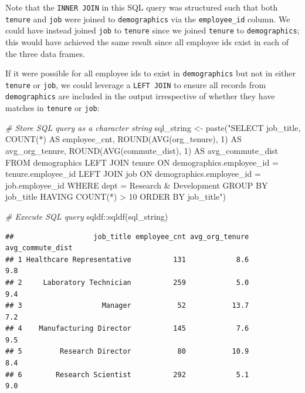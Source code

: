 \documentclass[
]{book}
\newenvironment{Shaded}{\begin{snugshade}}{\end{snugshade}}
\newcommand{\CommentTok}[1]{\textcolor[rgb]{0.56,0.35,0.01}{\textit{#1}}}
\newcommand{\FunctionTok}[1]{\textcolor[rgb]{0.00,0.00,0.00}{#1}}
\newcommand{\NormalTok}[1]{#1}
\newcommand{\OtherTok}[1]{\textcolor[rgb]{0.56,0.35,0.01}{#1}}
\newcommand{\SpecialCharTok}[1]{\textcolor[rgb]{0.00,0.00,0.00}{#1}}
\newcommand{\StringTok}[1]{\textcolor[rgb]{0.31,0.60,0.02}{#1}}
\begin{document}
Note that the \texttt{INNER\ JOIN} in this SQL query was structured such that both \texttt{tenure} and \texttt{job} were joined to \texttt{demographics} via the \texttt{employee\_id} column. We could have instead joined \texttt{job} to \texttt{tenure} since we joined \texttt{tenure} to \texttt{demographics}; this would have achieved the same result since all employee ids exist in each of the three data frames.

If it were possible for all employee ids to exist in \texttt{demographics} but not in either \texttt{tenure} or \texttt{job}, we could leverage a \texttt{LEFT\ JOIN} to ensure all records from \texttt{demographics} are included in the output irrespective of whether they have matches in \texttt{tenure} or \texttt{job}:

\begin{Shaded}
\begin{Highlighting}[]
\CommentTok{\# Store SQL query as a character string}
\NormalTok{sql\_string }\OtherTok{\textless{}{-}} \FunctionTok{paste}\NormalTok{(}\StringTok{"SELECT}
\StringTok{                      job\_title,}
\StringTok{                      COUNT(*) AS employee\_cnt,}
\StringTok{                      ROUND(AVG(org\_tenure), 1) AS avg\_org\_tenure,}
\StringTok{                      ROUND(AVG(commute\_dist), 1) AS avg\_commute\_dist}
\StringTok{                    FROM}
\StringTok{                        demographics}
\StringTok{                      LEFT JOIN}
\StringTok{                        tenure}
\StringTok{                      ON}
\StringTok{                        demographics.employee\_id = tenure.employee\_id}
\StringTok{                      LEFT JOIN}
\StringTok{                        job}
\StringTok{                      ON}
\StringTok{                        demographics.employee\_id = job.employee\_id}
\StringTok{                    WHERE}
\StringTok{                      dept = \textquotesingle{}Research \& Development\textquotesingle{}}
\StringTok{                    GROUP BY}
\StringTok{                      job\_title}
\StringTok{                    HAVING}
\StringTok{                      COUNT(*) \textgreater{} 10}
\StringTok{                    ORDER BY}
\StringTok{                      job\_title"}\NormalTok{)}

\CommentTok{\# Execute SQL query}
\NormalTok{sqldf}\SpecialCharTok{::}\FunctionTok{sqldf}\NormalTok{(sql\_string)}
\end{Highlighting}
\end{Shaded}

\begin{verbatim}
##                   job_title employee_cnt avg_org_tenure avg_commute_dist
## 1 Healthcare Representative          131            8.6              9.8
## 2     Laboratory Technician          259            5.0              9.4
## 3                   Manager           52           13.7              7.2
## 4    Manufacturing Director          145            7.6              9.5
## 5         Research Director           80           10.9              8.4
## 6        Research Scientist          292            5.1              9.0
\end{verbatim}
\end{document}
